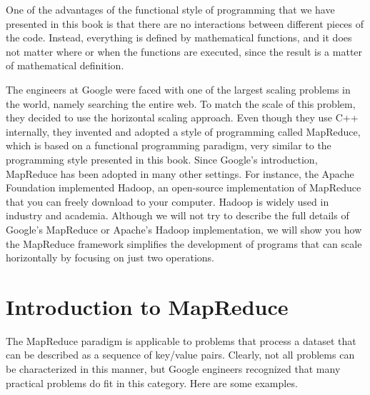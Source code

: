 One of the advantages of the functional style of programming
that we have presented in this book is that there are no
interactions between different pieces of the code.  Instead,
everything is defined by mathematical functions, and it does
not matter where or when the functions are executed, since the
result is a matter of mathematical definition.

The engineers at Google were faced with one of the largest
scaling problems in the world, namely searching the entire
web.  To match the scale of this problem, they decided to use
the horizontal scaling approach.  Even though they use C++
internally, they invented and adopted a style of
programming called MapReduce, which is based on a functional
programming paradigm, very similar to the programming style
presented in this book.  Since Google's introduction,
MapReduce has been adopted in many other settings.  For
instance, the Apache Foundation implemented Hadoop, an
open-source implementation of MapReduce that you can freely
download to your computer.  Hadoop is widely used in industry
and academia.  Although we will not try to describe the full details of
Google's MapReduce or Apache's Hadoop implementation, we will
show you how the MapReduce framework simplifies the
development of programs that can scale horizontally by
focusing on just two operations.

\section{Introduction to MapReduce}

The MapReduce paradigm is applicable to problems that process
a dataset that can be described as a sequence of key/value
pairs.  Clearly, not all problems can be characterized in this
manner, but Google engineers recognized that many practical
problems do fit in this category.  Here are some examples.

